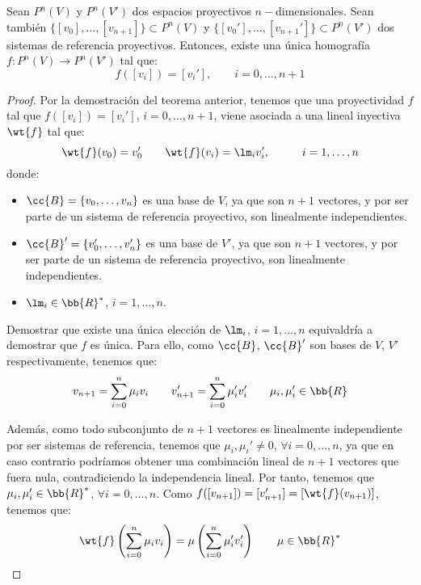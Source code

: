 \begin{teo}
    Sean $P^n(V)$ y $P^n(V')$ dos espacios proyectivos $n-$dimensionales. 
    Sean también $\{[v_0], \dots, [v_{n+1}]\}\subset P^n(V)$ y $\{[v_0'], \dots, [v_{n+1}']\}\subset P^n(V')$ dos sistemas de referencia proyectivos.
    Entonces, existe una única homografía $f:P^n(V)\to P^n(V')$ tal que:
    \begin{equation*}
        f([v_i]) = [v_i'],\qquad i=0,\dots,n+1
    \end{equation*}
\end{teo}
\begin{proof}
    Por la demostración del teorema anterior, tenemos que una proyectividad $f$ tal que $f([v_i]) = [v_i']$, $i=0,\dots,n+1$,
    viene asociada a una lineal inyectiva $\wt{f}$ tal que:
    \begin{equation*}
        \wt{f}(v_0) = v_0' \qquad \wt{f}(v_i) = \lm_i v_i',\hspace{1cm} i=1,\dots,n
    \end{equation*}
    donde:
    \begin{itemize}
        \item $\cc{B}= \{v_0,\dots,v_n\}$ es una base de $V$, ya que son $n+1$ vectores, y por ser parte de un sistema de referencia proyectivo, son linealmente independientes.
        \item $\cc{B}'= \{v_0',\dots,v_n'\}$ es una base de $V'$, ya que son $n+1$ vectores, y por ser parte de un sistema de referencia proyectivo, son linealmente independientes.
        \item $\lm_i \in \bb{R}^\ast$, $i=1,\dots,n$.
    \end{itemize}

    Demostrar que existe una única elección de $\lm_i$, $i=1,\dots,n$ equivaldría a demostrar que $f$ es única.
    Para ello, como $\cc{B}$, $\cc{B}'$ son bases de $V$, $V'$ respectivamente, tenemos que:
    \begin{equation*}
        v_{n+1} = \sum_{i=0}^n \mu_i v_i \qquad v_{n+1}' = \sum_{i=0}^n \mu_i' v_i' \qquad \mu_i,\mu_i' \in \bb{R}
    \end{equation*}

    Además, como todo subconjunto de $n+1$ vectores es linealmente independiente por ser sistemas de referencia, tenemos que $\mu_i, \mu_i' \neq 0$, $\forall i=0,\dots,n$,
    ya que en caso contrario podríamos obtener una combinación lineal de $n+1$ vectores que fuera nula, contradiciendo la independencia lineal.
    Por tanto, tenemos que $\mu_i, \mu_i' \in \bb{R}^\ast$, $\forall i=0,\dots,n$. Como $f([v_{n+1}]) = [v_{n+1}'] = [\wt{f}(v_{n+1})]$, tenemos que:
    \begin{equation*}
        \wt{f}\left(\sum_{i=0}^n \mu_i v_i\right) = \mu \left(\sum_{i=0}^n \mu_i' v_i'\right) \qquad \mu \in \bb{R}^\ast
    \end{equation*}


\end{proof}
